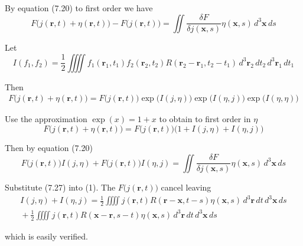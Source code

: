 


\bigskip
By equation (7.20) to first order we have
\begin{equation*}
F\big(j(\mathbf r,t)+\eta(\mathbf r,t)\big)
-F\big(j(\mathbf r,t)\big)
=\iint
\frac{\delta F}{\delta j(\mathbf x,s)}\eta(\mathbf x,s)\,d^3\mathbf x\,ds
\end{equation*}

Let
\begin{equation*}
I(f_1,f_2)=
\frac{1}{2}
\iiiint
f_1(\mathbf r_1,t_1)f_2(\mathbf r_2,t_2)R(\mathbf r_2-\mathbf r_1,t_2-t_1)
\,d^3\mathbf r_2\,dt_2\,d^3\mathbf r_1\,dt_1
\end{equation*}

Then
\begin{align*}
F\big(j(\mathbf r,t)+\eta(\mathbf r,t)\big)=F\big(j(\mathbf r,t)\big)
\exp\big(I(j,\eta)\big)\exp\big(I(\eta,j)\big)\exp\big(I(\eta,\eta)\big)
\end{align*}

Use the approximation $\exp(x)=1+x$ to obtain to first order in $\eta$
\begin{equation*}
F\big(j(\mathbf r,t)+\eta(\mathbf r,t)\big)
=F\big(j(\mathbf r,t)\big)\big(1+I(j,\eta)+I(\eta,j)\big)
\end{equation*}

Then by equation (7.20)
\begin{equation*}
F\big(j(\mathbf r,t)\big)I(j,\eta)+F\big(j(\mathbf r,t)\big)I(\eta,j)
=\iint
\frac{\delta F}{\delta j(\mathbf x,s)}\eta(\mathbf x,s)\,d^3\mathbf x\,ds
\tag{1}
\end{equation*}

Substitute (7.27) into (1).
The $F\big(j(\mathbf r,t)\big)$ cancel leaving
\begin{multline*}
I(j,\eta)+I(\eta,j)=
\frac{1}{2}\iiiint
j(\mathbf r,t)R(\mathbf r-\mathbf x,t-s)\eta(\mathbf x,s)\,d^3\mathbf r\,dt\,d^3\mathbf x\,ds
\\
{}+\frac{1}{2}\iiiint
j(\mathbf r,t)R(\mathbf x-\mathbf r,s-t)\eta(\mathbf x,s)\,d^3\mathbf r\,dt\,d^3\mathbf x\,ds
\end{multline*}

which is easily verified.



